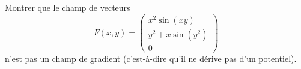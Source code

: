 
\begin{exercice}\label{exoOutilsMath-0059}

    Montrer que le champ de vecteurs
    \begin{equation}
        F(x,y)=\begin{pmatrix}
            x^2\sin(xy)    \\ 
            y^2+x\sin(y^2)    \\ 
            0    
        \end{pmatrix}
    \end{equation}
    n'est pas un champ de gradient (c'est-à-dire qu'il ne dérive pas d'un potentiel).

\end{exercice}

